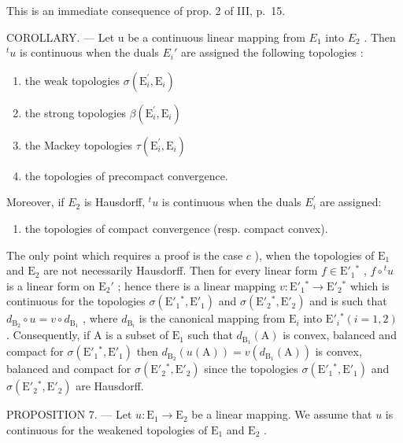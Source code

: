 This is an immediate consequence of prop. 2 of III, p.~15.

COROLLARY. --- Let u be a continuous linear mapping from \(E_{1}\) into \(E_{2}\) . Then \({}^t u\) is continuous when the duals \(E_{i}'\) are assigned the following topologies :

\begin{enumerate}
\def\labelenumi{\alph{enumi})}
\item
  the weak topologies \(\sigma (\mathrm{E}_i^{\prime},\mathrm{E}_i)\)
\item
  the strong topologies \(\beta (\mathrm{E}_i^{\prime},\mathrm{E}_i)\)
\item
  the Mackey topologies \(\tau (\mathrm{E}_i^{\prime},\mathrm{E}_i)\)
\item
  the topologies of precompact convergence.
\end{enumerate}

Moreover, if \(E_{2}\) is Hausdorff, \(^{t}u\) is continuous when the duals \(E_{i}^{\prime}\) are assigned:

\begin{enumerate}
\def\labelenumi{\alph{enumi})}
\setcounter{enumi}{4}
\tightlist
\item
  the topologies of compact convergence (resp. compact convex).
\end{enumerate}

The only point which requires a proof is the case \(c\) ), when the topologies of \(\mathrm{E}_1\) and \(\mathrm{E}_2\) are not necessarily Hausdorff. Then for every linear form \(f \in \mathrm{E}'_1{}^*\) , \(f \circ {}^t u\) is a linear form on \(\mathrm{E}_2'\) ; hence there is a linear mapping \(v: \mathrm{E}'_1{}^* \to \mathrm{E}'_2{}^*\) which is continuous for the topologies \(\sigma(\mathrm{E}'_1{}^*, \mathrm{E}'_1)\) and \(\sigma(\mathrm{E}'_2{}^*, \mathrm{E}'_2)\) and is such that \(d_{\mathrm{B}_2} \circ u = v \circ d_{\mathrm{B}_1}\) , where \(d_{\mathrm{B}_i}\) is the canonical mapping from \(\mathrm{E}_i\) into \(\mathrm{E}'_i{}^* (i = 1, 2)\) . Consequently, if A is a subset of \(\mathrm{E}_1\) such that \(d_{\mathrm{B}_1}(\mathrm{A})\) is convex, balanced and compact for \(\sigma(\mathrm{E}'_1{}^*, \mathrm{E}'_1)\) then \(d_{\mathrm{B}_2}(u(\mathrm{A})) = v(d_{\mathrm{B}_1}(\mathrm{A}))\) is convex, balanced and compact for \(\sigma(\mathrm{E}'_2{}^*, \mathrm{E}'_2)\) since the topologies \(\sigma(\mathrm{E}'_1{}^*, \mathrm{E}'_1)\) and \(\sigma(\mathrm{E}'_2{}^*, \mathrm{E}'_2)\) are Hausdorff.

PROPOSITION 7. --- Let \(u: \mathrm{E}_1 \to \mathrm{E}_2\) be a linear mapping. We assume that \(u\) is continuous for the weakened topologies of \(\mathrm{E}_1\) and \(\mathrm{E}_2\) .

